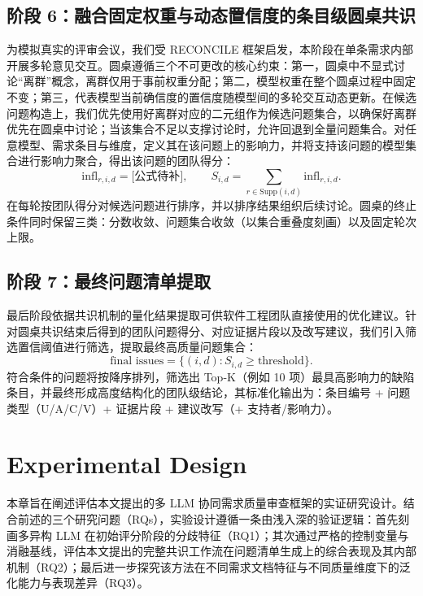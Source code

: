 \documentclass[a4paper,11pt]{ctexart}
\begin{document}
\subsection{阶段 6：融合固定权重与动态置信度的条目级圆桌共识}
为模拟真实的评审会议，我们受 RECONCILE 框架启发，本阶段在单条需求内部开展多轮意见交互。圆桌遵循三个不可更改的核心约束：第一，圆桌中不显式讨论“离群”概念，离群仅用于事前权重分配；第二，模型权重在整个圆桌过程中固定不变；第三，代表模型当前确信度的置信度随模型间的多轮交互动态更新。在候选问题构造上，我们优先使用好离群对应的二元组作为候选问题集合，以确保好离群优先在圆桌中讨论；当该集合不足以支撑讨论时，允许回退到全量问题集合。对任意模型、需求条目与维度，定义其在该问题上的影响力，并将支持该问题的模型集合进行影响力聚合，得出该问题的团队得分：
\begin{equation}
\mathrm{infl}_{r,i,d} = \text{[公式待补]}, \qquad S_{i,d} = \sum_{r \in \mathrm{Supp}(i,d)} \mathrm{infl}_{r,i,d}.
\end{equation}
在每轮按团队得分对候选问题进行排序，并以排序结果组织后续讨论。圆桌的终止条件同时保留三类：分数收敛、问题集合收敛（以集合重叠度刻画）以及固定轮次上限。

\subsection{阶段 7：最终问题清单提取}
最后阶段依据共识机制的量化结果提取可供软件工程团队直接使用的优化建议。针对圆桌共识结束后得到的团队问题得分、对应证据片段以及改写建议，我们引入筛选置信阈值进行筛选，提取最终高质量问题集合：
\begin{equation}
\text{final issues} = \{(i,d) : S_{i,d} \ge \text{threshold}\}.
\end{equation}
符合条件的问题将按降序排列，筛选出 Top-K（例如 10 项）最具高影响力的缺陷条目，并最终形成高度结构化的团队级结论，其标准化输出为：条目编号 + 问题类型（U/A/C/V）+ 证据片段 + 建议改写（+ 支持者/影响力）。

\section{Experimental Design}
\label{sec:experiment}
本章旨在阐述评估本文提出的多 LLM 协同需求质量审查框架的实证研究设计。结合前述的三个研究问题（RQs），实验设计遵循一条由浅入深的验证逻辑：首先刻画多异构 LLM 在初始评分阶段的分歧特征（RQ1）；其次通过严格的控制变量与消融基线，评估本文提出的完整共识工作流在问题清单生成上的综合表现及其内部机制（RQ2）；最后进一步探究该方法在不同需求文档特征与不同质量维度下的泛化能力与表现差异（RQ3）。
\end{document}
